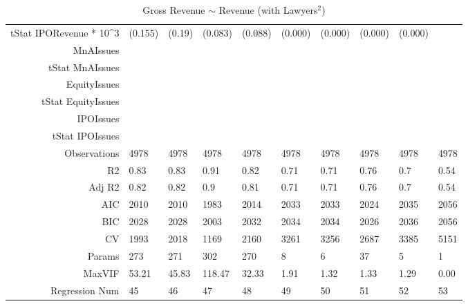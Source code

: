 \begin{table}[ht]
\begin{tabular}{rlllllllll}
  tStat IPORevenue * 10^3 & (0.155) & (0.19) & (0.083) & (0.088) & (0.000) & (0.000) & (0.000) & (0.000) &  \\ 
  MnAIssues &  &  &  &  &  &  &  &  &  \\ 
  tStat MnAIssues &  &  &  &  &  &  &  &  &  \\ 
  EquityIssues &  &  &  &  &  &  &  &  &  \\ 
  tStat EquityIssues &  &  &  &  &  &  &  &  &  \\ 
  IPOIssues &  &  &  &  &  &  &  &  &  \\ 
  tStat IPOIssues &  &  &  &  &  &  &  &  &  \\ 
  Observations & 4978 & 4978 & 4978 & 4978 & 4978 & 4978 & 4978 & 4978 & 4978 \\ 
  R2 & 0.83 & 0.83 & 0.91 & 0.82 & 0.71 & 0.71 & 0.76 & 0.7 & 0.54 \\ 
  Adj R2 & 0.82 & 0.82 & 0.9 & 0.81 & 0.71 & 0.71 & 0.76 & 0.7 & 0.54 \\ 
  AIC & 2010 & 2010 & 1983 & 2014 & 2033 & 2033 & 2024 & 2035 & 2056 \\ 
  BIC & 2028 & 2028 & 2003 & 2032 & 2034 & 2034 & 2026 & 2036 & 2056 \\ 
  CV & 1993 & 2018 & 1169 & 2160 & 3261 & 3256 & 2687 & 3385 & 5151 \\ 
  Params & 273 & 271 & 302 & 270 & 8 & 6 & 37 & 5 & 1 \\ 
  MaxVIF & 53.21 & 45.83 & 118.47 & 32.33 & 1.91 & 1.32 & 1.33 & 1.29 & 0.00 \\ 
  Regression Num & 45 & 46 & 47 & 48 & 49 & 50 & 51 & 52 & 53 \\ 
   \hline
\end{tabular}
\caption{Gross Revenue $\sim$ Revenue (with Lawyers$^2$)} 
\end{table}
